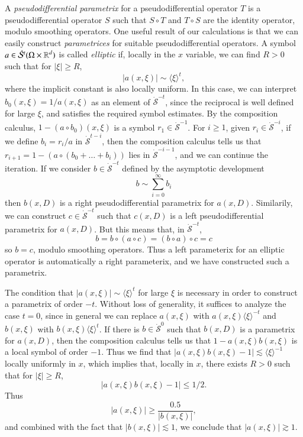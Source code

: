 A \emph{pseudodifferential parametrix} for a pseudodifferential operator $T$ is a pseudodifferential operator $S$ such that $S \circ T$ and $T \circ S$ are the identity operator, modulo smoothing operators. One useful result of our calculations is that we can easily construct \emph{parametrices} for suitable pseudodifferential operators. A symbol $a \in \dot{\mathcal{S}}^t(\Omega \times \operatorname{\mathbb{R}}^d)$ is called \emph{elliptic} if, locally in the $x$ variable, we can find $R > 0$ such that for $|\xi| \geq R$,
%
\[ |a(x,\xi)| \sim \langle \xi \rangle^t, \]
%
where the implicit constant is also locally uniform. In this case, we can interpret $b_0(x,\xi) = 1 / a(x,\xi)$ as an element of $\dot{\mathcal{S}}^{-t}$, since the reciprocal is well defined for large $\xi$, and satisfies the required symbol estimates. By the composition calculus, $1 - (a \circ b_0)(x,\xi)$ is a symbol $r_1 \in \dot{\mathcal{S}}^{-1}$. For $i \geq 1$, given $r_i \in \dot{\mathcal{S}}^{-i}$, if we define $b_i = r_i / a$ in $\dot{\mathcal{S}}^{t-i}$, then the composition calculus tells us that $r_{i+1} = 1 - (a \circ (b_0 + \dots + b_i))$ lies in $\dot{\mathcal{S}}^{-i-1}$, and we can continue the iteration. If we consider $b \in \dot{\mathcal{S}}^{-t}$ defined by the asymptotic development
%
\[ b \sim \sum_{i = 0}^\infty b_i \]
%
then $b(x,D)$ is a right pseudodifferential parametrix for $a(x,D)$. Similarily, we can construct $c \in \dot{\mathcal{S}}^{-t}$ such that $c(x,D)$ is a left pseudodifferential parametrix for $a(x,D)$. But this means that, in $\dot{\mathcal{S}}^{-t}$,
%
\[ b = b \circ (a \circ c) = (b \circ a) \circ c = c \]
%
so $b = c$, modulo smoothing operators. Thus a left parameterix for an elliptic operator is automatically a right parameterix, and we have constructed such a parametrix.

\begin{remark}
    The condition that $|a(x,\xi)| \sim \langle \xi \rangle^t$ for large $\xi$ is necessary in order to construct a parametrix of order $-t$. Without loss of generality, it suffices to analyze the case $t = 0$, since in general we can replace $a(x,\xi)$ with $a(x,\xi) \langle \xi \rangle^{-t}$ and $b(x,\xi)$ with $b(x,\xi) \langle \xi \rangle^t$. If there is $b \in \dot{\mathcal{S}}^0$ such that $b(x,D)$ is a parametrix for $a(x,D)$, then the composition calculus tells us that $1 - a(x,\xi) b(x,\xi)$ is a local symbol of order $-1$. Thus we find that $|a(x,\xi) b(x,\xi) - 1| \lesssim \langle \xi \rangle^{-1}$ locally uniformly in $x$, which implies that, locally in $x$, there exists $R > 0$ such that for $|\xi| \geq R$,
    \[ |a(x,\xi) b(x,\xi) - 1| \leq 1/2. \]
    Thus
    \[ |a(x,\xi)| \geq \frac{0.5}{|b(x,\xi)|}, \]
    and combined with the fact that $|b(x,\xi)| \lesssim 1$, we conclude that $|a(x,\xi)| \gtrsim 1$.
\end{remark}

